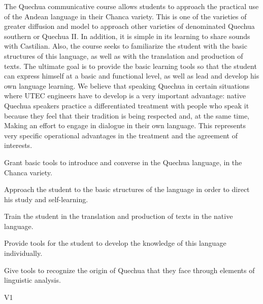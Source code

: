 \begin{syllabus}


\begin{justification}
The Quechua communicative course allows students to approach the practical use of the Andean language in their Chanca variety. This is one of the varieties of greater diffusion and model to approach other varieties of denominated Quechua southern or Quechua II. In addition, it is simple in its learning to share sounds with Castilian. Also, the course seeks to familiarize the student with the basic structures of this language, as well as with the translation and production of texts. The ultimate goal is to provide the basic learning tools so that the student can express himself at a basic and functional level, as well as lead and develop his own language learning.
We believe that speaking Quechua in certain situations where UTEC engineers have to develop is a very important advantage: native Quechua speakers practice a differentiated treatment with people who speak it because they feel that their tradition is being respected and, at the same time, Making an effort to engage in dialogue in their own language. This represents very specific operational advantages in the treatment and the agreement of interests. 
\end{justification}

\begin{goals}
\item Grant basic tools to introduce and converse in the Quechua language, in the Chanca variety.
\item Approach the student to the basic structures of the language in order to direct his study and self-learning.
\item Train the student in the translation and production of texts in the native language.
\item Provide tools for the student to develop the knowledge of this language individually.
\item Give tools to recognize the origin of Quechua that they face through elements of linguistic analysis.
\end{goals}

\begin{outcomes}{V1}
    \item {} %
    \item {} %
    \item {} %
    \item {} %
    \item {} %
\end{outcomes}


\end{syllabus}
